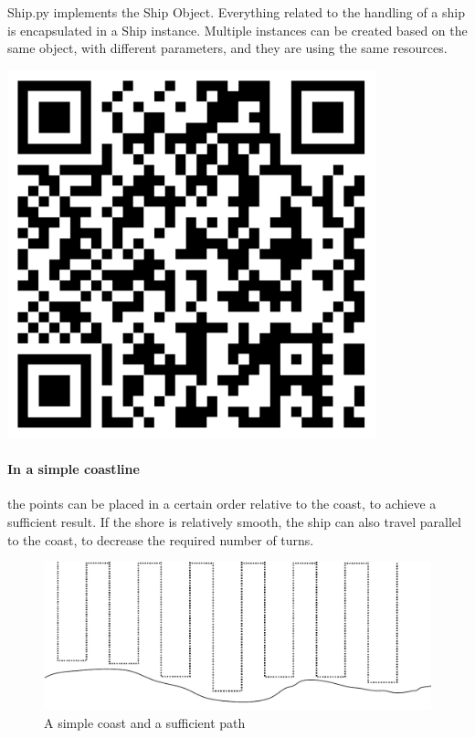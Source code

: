 \begin{tcolorbox}[colback=cyan!5,colframe=cyan!40!black,title=Code: Ship.py \\ https://www.dropbox.com/s/fmtsaatql7jqjhw/Ship\texttt{\_}nofilter.py]
\begin{minipage}{0,6\textwidth}
Ship.py implements the Ship Object. Everything related to the handling of a ship is encapsulated in a Ship instance. Multiple instances can be created based on the same object, with different parameters, and they are using the same resources.
\end{minipage}
\begin{minipage}{0,35\textwidth}
\raggedleft
\includegraphics[width=0.8\textwidth]{img/ship}
\end{minipage}
\end{tcolorbox}

\paragraph{In a simple coastline} the points can be placed in a certain order relative to the coast, to achieve a sufficient result. If the shore is relatively smooth, the ship can also travel parallel to the coast, to decrease the required number of turns.

\begin{figure}[H]
	\centering
	\includegraphics[width=\textwidth]{img/simplecoast}
	\caption{A simple coast and a sufficient path}
	\label{fig:simplecoast}
\end{figure}

